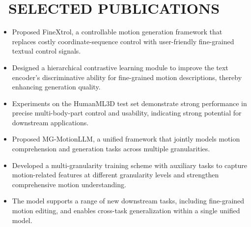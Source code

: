 \documentclass{resume}
\begin{document}
\section{\texorpdfstring{\faFileText\ SELECTED PUBLICATIONS}{SELECTED PUBLICATIONS}}
\begin{itemize}
  \item Proposed FineXtrol, a controllable motion generation framework that replaces costly coordinate-sequence control with user-friendly fine-grained textual control signals.
  \item Designed a hierarchical contrastive learning module to improve the text encoder's discriminative ability for fine-grained motion descriptions, thereby enhancing generation quality.
  \item Experiments on the HumanML3D test set demonstrate strong performance in precise multi-body-part control and usability, indicating strong potential for downstream applications.
\end{itemize}

\begin{itemize}
  \item Proposed MG-MotionLLM, a unified framework that jointly models motion comprehension and generation tasks across multiple granularities.
  \item Developed a multi-granularity training scheme with auxiliary tasks to capture motion-related features at different granularity levels and strengthen comprehensive motion understanding.
  \item The model supports a range of new downstream tasks, including fine-grained motion editing, and enables cross-task generalization within a single unified model.
\end{itemize}
\end{document}

